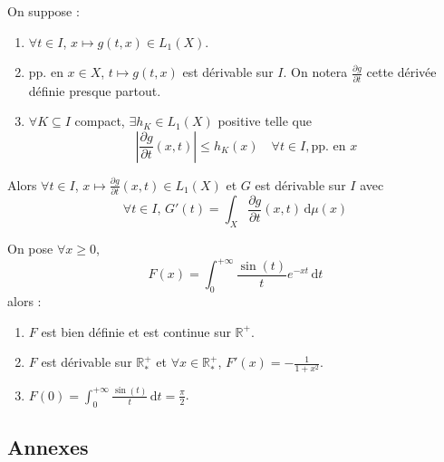 	\begin{theorem}
		On suppose :
		\begin{enumerate}[label=(\roman*)]
			\item $\forall t \in I$, $x \mapsto g(t,x) \in L_1(X)$.
			\item pp. en $x \in X$, $t \mapsto g(t,x)$ est dérivable sur $I$. On notera $\frac{\partial g}{\partial t}$ cette dérivée définie presque partout.
			\item $\forall K \subseteq I$ compact, $\exists h_K \in L_1(X)$ positive telle que
			\[ \left| \frac{\partial g}{\partial t}(x,t) \right| \leq h_K(x) \quad \forall t \in I, \text{pp. en } x \]
		\end{enumerate}
		Alors $\forall t \in I$, $x \mapsto \frac{\partial g}{\partial t}(x, t) \in L_1(X)$ et $G$ est dérivable sur $I$ avec
		\[ \forall t \in I, \, G'(t) = \int_X \frac{\partial g}{\partial t}(x, t) \, \mathrm{d}\mu(x) \]
	\end{theorem}


	\begin{application}
		On pose $\forall x \geq 0$,
		\[ F(x) = \int_0^{+\infty} \frac{\sin(t)}{t} e^{-xt} \, \mathrm{d}t \]
		alors :
		\begin{enumerate}[label=(\roman*)]
			\item $F$ est bien définie et est continue sur $\mathbb{R}^+$.
			\item $F$ est dérivable sur $\mathbb{R}^+_*$ et $\forall x \in \mathbb{R}^+_*$, $F'(x) = -\frac{1}{1+x^2}$.
			\item $F(0) = \int_0^{+\infty} \frac{\sin(t)}{t} \, \mathrm{d}t = \frac{\pi}{2}$.
		\end{enumerate}
	\end{application}

	\newpage
	\subsection*{Annexes}


